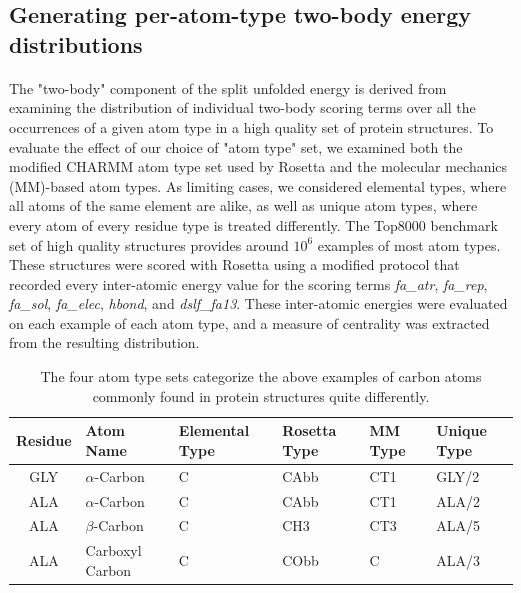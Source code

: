 \subsection{Generating per-atom-type two-body energy distributions}
\paragraph{}
The "two-body" component of the split unfolded energy is derived from examining the distribution of individual two-body scoring terms over all the occurrences of a given atom type in a high quality set of protein structures.
To evaluate the effect of our choice of "atom type" set, we examined both the modified CHARMM atom type set used by Rosetta\cite{leaver-fay_chapter_2011,bernard_charmm_1983} and the molecular mechanics (MM)-based atom types\cite{renfrew_incorporation_2012}. %
As limiting cases, we considered elemental types, where all atoms of the same element are alike, as well as unique atom types, where every atom of every residue type is treated differently.
The Top8000 benchmark set of high quality structures\cite{lovell_structure_2003} provides around $10^6$ examples of most atom types. These structures were scored with Rosetta using a modified protocol that recorded every inter-atomic energy value for the scoring terms \textit{fa\_atr}, \textit{fa\_rep}, \textit{fa\_sol}, \textit{fa\_elec}, \textit{hbond}, and \textit{dslf\_fa13}.
These inter-atomic energies were evaluated on each example of each atom type, and a measure of centrality was extracted from the resulting distribution.

\begin{table}[!htbp]

\fontsize{9pt}{9pt}
\selectfont

\begin{tabular}{c|lllll}
Residue & Atom Name & Elemental Type & Rosetta Type & MM Type & Unique Type\\
\hline
GLY & $\alpha$-Carbon & C & CAbb & CT1 & GLY/2\\
ALA & $\alpha$-Carbon & C & CAbb & CT1 & ALA/2\\
ALA & $\beta$-Carbon & C & CH3 & CT3 & ALA/5\\
ALA & Carboxyl Carbon & C & CObb & C & ALA/3\\
\end{tabular}

\fontsize{10pt}{11pt}
\selectfont
\caption{The four atom type sets categorize the above examples of carbon atoms commonly found in protein structures quite differently.}
\label{tab:atypes_example}

\end{table}

